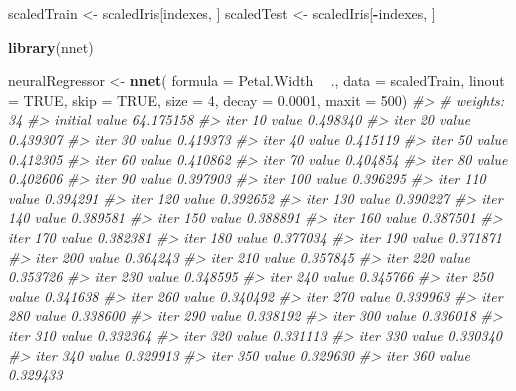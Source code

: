 \documentclass[]{book}
\newenvironment{Shaded}{\begin{snugshade}}{\end{snugshade}}
\newcommand{\CommentTok}[1]{\textcolor[rgb]{0.56,0.35,0.01}{\textit{#1}}}
\newcommand{\DataTypeTok}[1]{\textcolor[rgb]{0.13,0.29,0.53}{#1}}
\newcommand{\DecValTok}[1]{\textcolor[rgb]{0.00,0.00,0.81}{#1}}
\newcommand{\FloatTok}[1]{\textcolor[rgb]{0.00,0.00,0.81}{#1}}
\newcommand{\KeywordTok}[1]{\textcolor[rgb]{0.13,0.29,0.53}{\textbf{#1}}}
\newcommand{\NormalTok}[1]{#1}
\newcommand{\OperatorTok}[1]{\textcolor[rgb]{0.81,0.36,0.00}{\textbf{#1}}}
\newcommand{\OtherTok}[1]{\textcolor[rgb]{0.56,0.35,0.01}{#1}}
\newcommand{\StringTok}[1]{\textcolor[rgb]{0.31,0.60,0.02}{#1}}
\begin{document}
\begin{Shaded}
\begin{Highlighting}[]
\NormalTok{scaledTrain <-}\StringTok{ }\NormalTok{scaledIris[indexes, ]}
\NormalTok{scaledTest <-}\StringTok{ }\NormalTok{scaledIris[}\OperatorTok{-}\NormalTok{indexes, ]}
\end{Highlighting}
\end{Shaded}

\begin{Shaded}
\begin{Highlighting}[]
\KeywordTok{library}\NormalTok{(nnet)}

\NormalTok{neuralRegressor <-}\StringTok{ }\KeywordTok{nnet}\NormalTok{(}
  \DataTypeTok{formula =}\NormalTok{ Petal.Width }\OperatorTok{~}\StringTok{ }\NormalTok{.,}
  \DataTypeTok{data =}\NormalTok{ scaledTrain,}
  \DataTypeTok{linout =} \OtherTok{TRUE}\NormalTok{,}
  \DataTypeTok{skip =} \OtherTok{TRUE}\NormalTok{,}
  \DataTypeTok{size =} \DecValTok{4}\NormalTok{,}
  \DataTypeTok{decay =} \FloatTok{0.0001}\NormalTok{,}
  \DataTypeTok{maxit =} \DecValTok{500}\NormalTok{)}
\CommentTok{#> # weights:  34}
\CommentTok{#> initial  value 64.175158 }
\CommentTok{#> iter  10 value 0.498340}
\CommentTok{#> iter  20 value 0.439307}
\CommentTok{#> iter  30 value 0.419373}
\CommentTok{#> iter  40 value 0.415119}
\CommentTok{#> iter  50 value 0.412305}
\CommentTok{#> iter  60 value 0.410862}
\CommentTok{#> iter  70 value 0.404854}
\CommentTok{#> iter  80 value 0.402606}
\CommentTok{#> iter  90 value 0.397903}
\CommentTok{#> iter 100 value 0.396295}
\CommentTok{#> iter 110 value 0.394291}
\CommentTok{#> iter 120 value 0.392652}
\CommentTok{#> iter 130 value 0.390227}
\CommentTok{#> iter 140 value 0.389581}
\CommentTok{#> iter 150 value 0.388891}
\CommentTok{#> iter 160 value 0.387501}
\CommentTok{#> iter 170 value 0.382381}
\CommentTok{#> iter 180 value 0.377034}
\CommentTok{#> iter 190 value 0.371871}
\CommentTok{#> iter 200 value 0.364243}
\CommentTok{#> iter 210 value 0.357845}
\CommentTok{#> iter 220 value 0.353726}
\CommentTok{#> iter 230 value 0.348595}
\CommentTok{#> iter 240 value 0.345766}
\CommentTok{#> iter 250 value 0.341638}
\CommentTok{#> iter 260 value 0.340492}
\CommentTok{#> iter 270 value 0.339963}
\CommentTok{#> iter 280 value 0.338600}
\CommentTok{#> iter 290 value 0.338192}
\CommentTok{#> iter 300 value 0.336018}
\CommentTok{#> iter 310 value 0.332364}
\CommentTok{#> iter 320 value 0.331113}
\CommentTok{#> iter 330 value 0.330340}
\CommentTok{#> iter 340 value 0.329913}
\CommentTok{#> iter 350 value 0.329630}
\CommentTok{#> iter 360 value 0.329433}

\end{Highlighting}
\end{Shaded}
\end{document}

